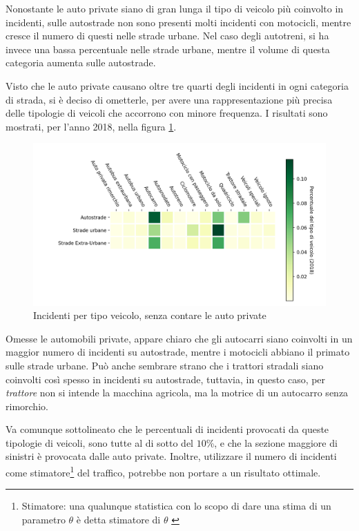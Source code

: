 \documentclass[a4paper,12pt]{report}
\newcommand{\quotestyle}[1]{\textit{#1}}
\begin{document}
Nonostante le auto private siano di gran lunga il tipo di veicolo 
più coinvolto in incidenti, sulle autostrade non sono presenti molti incidenti con motocicli, 
mentre cresce il numero di questi nelle strade urbane.
Nel caso degli autotreni, si ha invece una bassa percentuale nelle strade 
urbane, mentre il volume di questa categoria aumenta sulle autostrade.

Visto che le auto private causano oltre tre quarti degli 
incidenti in ogni categoria di strada,  
si è deciso di ometterle, per avere una rappresentazione più 
precisa delle tipologie di veicoli che accorrono con minore frequenza.
I risultati sono mostrati, per l'anno 2018, 
nella figura \ref{fig:differenza-strade-no-auto}.

\begin{figure}
    \includegraphics[width=\linewidth]{../src/incidenti/incidenti_senza_coords/tipo_veicoli/differenza_senza_auto.png}
    \caption{Incidenti per tipo veicolo, senza contare le auto private}
    \label{fig:differenza-strade-no-auto}
\end{figure}

Omesse le automobili private, appare chiaro che gli autocarri siano coinvolti in un maggior 
numero di incidenti su autostrade, mentre i motocicli abbiano il primato sulle strade urbane.
Può anche sembrare strano che i trattori stradali siano coinvolti così spesso in incidenti 
su autostrade, tuttavia, in questo caso, per \quotestyle{trattore} non si intende la macchina 
agricola, ma la motrice di un autocarro senza rimorchio.

Va comunque sottolineato che le percentuali di incidenti provocati da queste tipologie di 
veicoli, sono tutte al di sotto del $10$\%, e che la sezione maggiore di sinistri è 
provocata dalle auto private. 
Inoltre, utilizzare il numero di incidenti come stimatore\footnote{Stimatore: una qualunque statistica con 
lo scopo di dare una stima di un parametro $\theta$ è detta stimatore 
di $\theta$ \cite{PROB_E_STATISTICA:4}} 
del traffico, potrebbe non portare a un risultato ottimale. 
\end{document}
